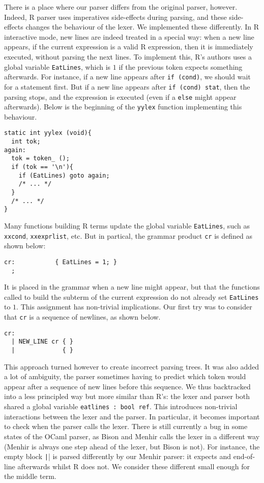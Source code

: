 \documentclass{article}
\newcommand\OCaml{OCaml}
\newcommand\R{R}
\begin{document}
There is a place where our parser differs from the original parser, however.
Indeed, \R{} parser uses imperatives side-effects during parsing,
and these side-effects changes the behaviour of the lexer.
We implemented these differently.
In \R{} interactive mode, new lines are indeed treated in a special way:
when a new line appears, if the current expression is a valid \R{} expression,
then it is immediately executed, without parsing the next lines.
To implement this, \R{}'s authors uses a global variable
\texttt{EatLines}, which is \(1\) if the previous token
expects something afterwards.
For instance, if a new line appears after \texttt{if (cond)},
we should wait for a statement first.
But if a new line appears after \texttt{if (cond) stat},
then the parsing stops, and the expression is executed
(even if a \texttt{else} might appear afterwards).
Below is the beginning of the \texttt{yylex} function
implementing this behaviour.
\begin{verbatim}
static int yylex (void){
  int tok;
again:
  tok = token_ ();
  if (tok == '\n'){
    if (EatLines) goto again;
    /* ... */
  }
  /* ... */
}
\end{verbatim}
Many functions building \R{} terms update the global variable \texttt{EatLines},
such as \texttt{xxcond}, \texttt{xxexprlist}, etc.
But in partical, the grammar product \texttt{cr} is defined as shown below:
\begin{verbatim}
cr:           { EatLines = 1; }
  ;
\end{verbatim}
It is placed in the grammar when a new line might appear,
but that the functions called to build the subterm of the current expression
do not already set \texttt{EatLines} to \(1\).
This assignment has non-trivial implications.
Our first try was to
consider that \texttt{cr} is a sequence of newlines,
as shown below.
\begin{verbatim}
cr:
  | NEW_LINE cr { }
  |             { }
\end{verbatim}
This approach turned however to create incorrect parsing trees.
It was also added a lot of ambiguity,
the parser sometimes having to predict which token would appear
after a sequence of new lines before this sequence.
We thus backtracked into a less principled way but more similar than \R{}’s:
the lexer and parser both shared a global variable \texttt{eatlines : bool ref}.
This introduces non-trivial interactions between the lexer and the parser.
In particular, it becomes important to check when the parser calls the lexer.
There is still currently a bug in some states of the \OCaml{} parser,
as Bison and Menhir calls the lexer in a different way
(Menhir is always one step ahead of the lexer,
but Bison is not).
For instance, the empty block \texttt|{}|
is parsed differently by our Menhir parser:
it expects and end-of-line afterwards whilst \R{} does not.
We consider these different small enough for the middle term.
\end{document}
